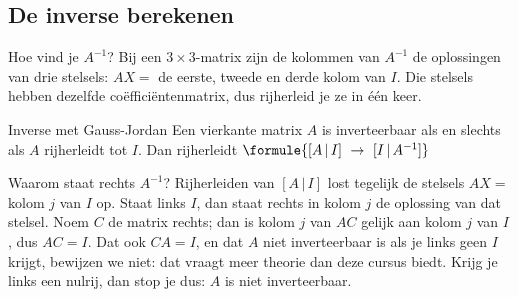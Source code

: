 \begin{oefeningen}
\end{oefeningen}

\subsection{De inverse berekenen}

Hoe vind je $A^{-1}$? Bij een $3 \times 3$-matrix zijn de kolommen van $A^{-1}$ de oplossingen van drie stelsels: $AX = $ de eerste, tweede en derde kolom van $I$. Die stelsels hebben dezelfde coëfficiëntenmatrix, dus rijherleid je ze in één keer.

\begin{theorie}
\begin{stelling}{Inverse met Gauss-Jordan}
Een vierkante matrix $A$ is inverteerbaar als en slechts als $A$ rijherleidt tot $I$. Dan rijherleidt \quad $\formule{[A \,|\, I] \ \to \ [I \,|\, A^{-1}]}$
\end{stelling}
\end{theorie}

Waarom staat rechts $A^{-1}$? Rijherleiden van $[A \,|\, I]$ lost tegelijk de stelsels $AX = $ kolom $j$ van $I$ op. Staat links $I$, dan staat rechts in kolom $j$ de oplossing van dat stelsel. Noem $C$ de matrix rechts; dan is kolom $j$ van $AC$ gelijk aan kolom $j$ van $I$, dus $AC = I$. Dat ook $CA = I$, en dat $A$ niet inverteerbaar is als je links geen $I$ krijgt, bewijzen we niet: dat vraagt meer theorie dan deze cursus biedt. Krijg je links een nulrij, dan stop je dus: $A$ is niet inverteerbaar.

